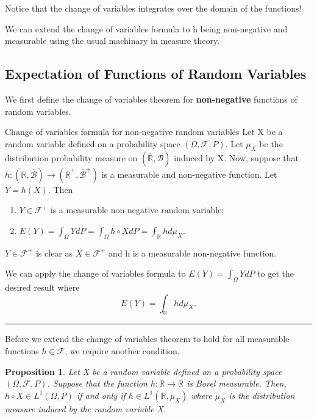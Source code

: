 \documentclass[twoside]{article}
\newtheorem{proposition}[theorem]{Proposition}
\newenvironment{proof}{{\bf Proof:}}{\hfill\rule{2mm}{2mm}}
\newcommand{\sigmalgebra}{\mathcal{F}}
\newcommand{\borelsigmaalgebra}{\mathcal{B}}
\begin{document}
Notice that the change of variables integrates over the domain of the functions!

We can extend the change of variables formula to h being non-negative and measurable using the usual machinary in measure theory.

\subsection{Expectation of Functions of Random Variables}

We first define the change of variables theorem for \textbf{non-negative} functions of random variables.

\begin{theorem_exam}{Change of variables formula for non-negative random variables}{} Let X be a random variable defined on a probability space $(\Omega, \mathcal{F}, P)$. Let $\mu_X$ be the distribution probability measure on $(\overline{\mathbb{R}}, \overline{\borelsigmaalgebra})$ induced by X. Now, suppose that $h: (\overline{\mathbb{R}}, \overline{\borelsigmaalgebra}) \rightarrow (\overline{\mathbb{R}}^+, \overline{\borelsigmaalgebra}^+)$ is a measurable and non-negative function. Let $Y = h(X).$ Then 
\begin{enumerate}
\item  $Y \in \mathcal{F}^+$ is a measurable non-negative random variable; 
\item $
E(Y) = \int_{\Omega} YdP = \int_{\Omega}h \circ XdP = \int_{\mathbb{R}}hd\mu_X .
$
\end{enumerate}
\end{theorem_exam}
\begin{proof} $Y \in \sigmalgebra^+$ is clear as $X \in \sigmalgebra^+$ and h is a measurable non-negative function. 

We can apply the change of variables formula to $E(Y) = \int_{\Omega} YdP$ to get the desired result where 
$$
E(Y) = \int_{\mathbb{R}}hd\mu_X .
$$
\end{proof}

Before we extend the change of variables theorem to hold for all measurable functions $h \in \sigmalgebra$, we require another condition.
\begin{proposition}Let X be a random variable defined on a probability space $(\Omega, \mathcal{F}, P)$. Suppose that the function $h: \mathbb{R} \rightarrow \mathbb{R}$ is Borel measurable. Then, $h \circ X \in L^1(\Omega,P)$ if and only if $h \in L^1(\mathbb{R},\mu_X)$ where $\mu_X$ is the distribution measure induced by the random variable X.
\end{proposition}
\end{document}
